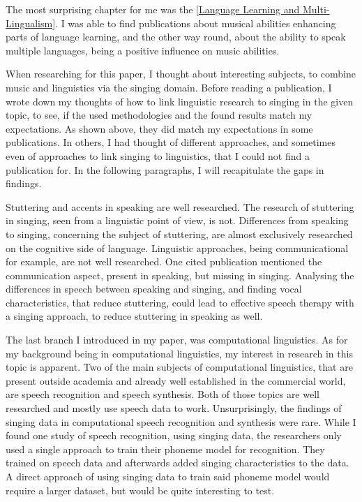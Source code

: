 The most surprising chapter for me was the  \autoref{Language Learning and Multi-Lingualism}. I was able to find publications about musical abilities enhancing parts of language learning, and the other way round, about the ability to speak multiple languages, being a positive influence on music abilities.






When researching for this paper, I thought about interesting subjects, to combine music and linguistics via the singing domain. Before reading a publication, I wrote down my thoughts of how to link linguistic research to singing in the given topic, to see, if the used methodologies and the found results match my expectations. As shown above, they did match my expectations in some publications. In others, I had thought of different approaches, and sometimes even of approaches to link singing to linguistics, that I could not find a publication for. In the following paragraphs, I will recapitulate the gaps in findings.

Stuttering and accents in speaking are well researched. The research of stuttering in singing, seen from a linguistic point of view, is not. Differences from speaking to singing, concerning the subject of stuttering, are almost exclusively researched on the cognitive side of language. Linguistic approaches, being communicational for example, are not well researched. One cited publication mentioned the communication aspect, present in speaking, but missing in singing. Analysing the differences in speech between speaking and singing, and finding vocal characteristics, that reduce stuttering, could lead to effective speech therapy with a singing approach, to reduce stuttering in speaking as well.

The last branch I introduced in my paper, was computational linguistics. As for my background being in computational linguistics, my interest in research in this topic is apparent. Two of the main subjects of computational linguistics, that are present outside academia and already well established in the commercial world, are speech recognition and speech synthesis. Both of those topics are well researched and mostly use speech data to work. Unsurprisingly, the findings of singing data in computational speech recognition and synthesis were rare. While I found one study of speech recognition, using singing data, the researchers only used a single approach to train their phoneme model for recognition. They trained on speech data and afterwards added singing characteristics to the data. A direct approach of using singing data to train said phoneme model would require a larger dataset, but would be quite interesting to test.

